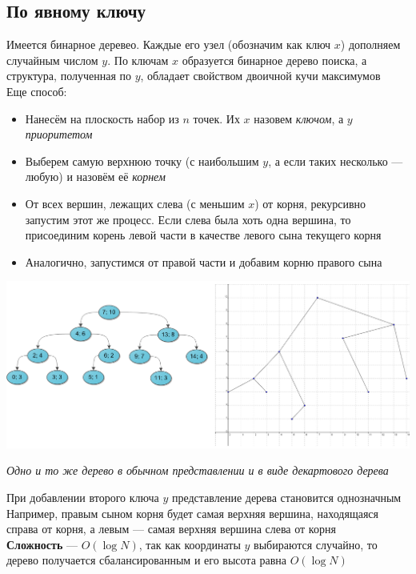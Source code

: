 \documentclass[a4paper]{article}
\begin{document}
\subsection{По явному ключу}
Имеется бинарное деревео. Каждые его узел (обозначим как ключ $x$) дополняем случайным числом $y$. По ключам $x$ образуется бинарное дерево поиска, а структура, полученная по $y$, обладает свойством двоичной кучи максимумов\\[2mm]
\indent Еще способ:
\begin{itemize}
    \item Нанесём на плоскость набор из $n$ точек. Их $x$ назовем \textit{ключом}, а $y$ \textit{приоритетом}
    \item Выберем самую верхнюю точку (с наибольшим $y$, а если таких несколько — любую) и назовём её \textit{корнем}
    \item От всех вершин, лежащих слева (с меньшим $x$) от корня, рекурсивно запустим этот же процесс. Если слева была хоть одна вершина, то присоединим корень левой части в качестве левого сына текущего корня
    \item Аналогично, запустимся от правой части и добавим корню правого сына
\end{itemize}
\begin{center}
    \includegraphics[width=1\linewidth]{decart.png}
    \label{decart}
\end{center}
\begin{center}
    \textit{Одно и то же дерево в обычном представлении и в виде декартового дерева}
\end{center}
При добавлении второго ключа $y$ представление дерева становится однозначным\\[2mm]
Например, правым сыном корня будет самая верхняя вершина, находящаяся справа от корня, а левым — самая верхняя вершина слева от корня\\[2mm]
\indent\textbf{Сложность} — $O(\log N)$, так как координаты $y$ выбираются случайно, то дерево получается сбалансированным и его высота равна $O(\log N)$
\end{document}
